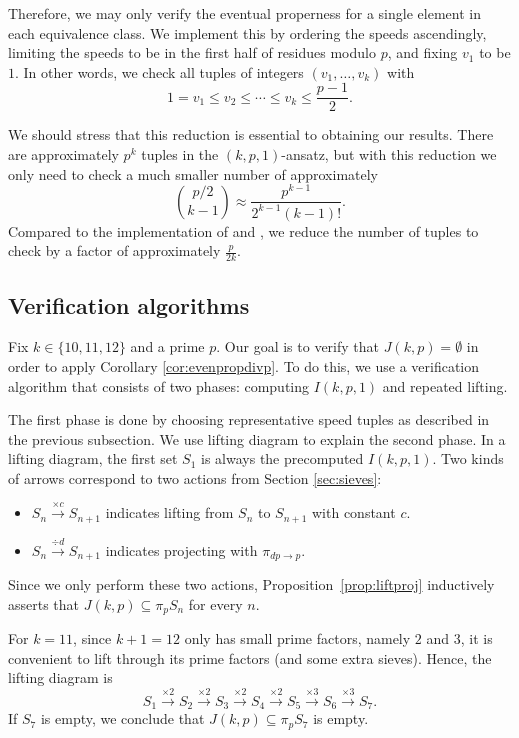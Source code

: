 \documentclass[11pt]{amsart}
\theoremstyle{definition}
\theoremstyle{remark}
\begin{document}
Therefore, we may only verify the eventual properness for a single element in each equivalence class. 
We implement this by ordering the speeds ascendingly,
limiting the speeds to be in the first half of residues modulo $p$, and fixing $v_1$ to be $1$.
In other words, we check all tuples of integers $(v_1,\ldots,v_k)$ with 
\[1=v_1\leq v_2\leq\cdots\leq v_k\leq\frac{p-1}{2}.\] 

We should stress that this reduction is essential to obtaining our results. 
There are approximately $p^k$ tuples in the $(k,p,1)$-ansatz,
but with this reduction we only need to check a much smaller number of approximately
\[\binom{p/2}{k-1}\approx\frac{p^{k-1}}{2^{k-1}(k-1)!}.\]
Compared to the implementation of \cite{Rosenfeld} and \cite{Trakulthongchai}, 
we reduce the number of tuples to check by a factor of approximately $\frac{p}{2k}$. 

\subsection{Verification algorithms}
\label{subsec:algo}
Fix $k\in\{10,11,12\}$ and a prime $p$. Our goal is to verify that $J(k,p)=\emptyset$
in order to apply Corollary \ref{cor:evenpropdivp}. To do this, we use a verification algorithm that consists of two phases:
computing $I(k, p, 1)$ and repeated lifting.

The first phase is done by choosing representative speed tuples as described in the previous subsection. 
We use lifting diagram to explain the second phase. In a lifting diagram, the first set $S_1$ is always the precomputed $I(k,p,1)$. 
Two kinds of arrows correspond to two actions from Section \ref{sec:sieves}:
\begin{itemize}
    \item $S_n\xrightarrow{\times c}S_{n+1}$ indicates lifting from $S_n$ to $S_{n+1}$ with constant $c$.
    \item $S_n\xrightarrow{\div d}S_{n+1}$ indicates projecting with $\pi_{dp\rightarrow p}$.
\end{itemize}
Since we only perform these two actions, Proposition~\ref{prop:liftproj} inductively asserts that 
$J(k,p) \subseteq \pi_p S_n$ for every $n$. 

For $k=11$, since $k+1=12$ only has small prime factors, namely $2$ and $3$,
it is convenient to lift through its prime factors (and some extra sieves). Hence, the lifting diagram is
\[S_1\xrightarrow{\times 2}S_2\xrightarrow{\times 2}S_3\xrightarrow{\times 2}S_4\xrightarrow{\times 2}S_5\xrightarrow{\times 3}S_6\xrightarrow{\times 3}S_7.\]
If $S_7$ is empty, we conclude that $J(k,p)\subseteq\pi_pS_7$ is empty.
\end{document}
